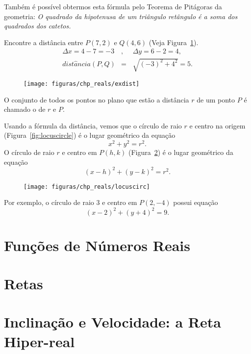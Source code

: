 \documentclass{svmono}
\begin{document}
Também é possível obtermos esta fórmula pelo Teorema de Pitágoras
da geometria: \emph{O quadrado da hipotenusa de um triângulo
retângulo é a soma dos quadrados dos catetos.}

\begin{example}
\label{ex:distance}
Encontre a distância entre $P(7,2)$ e $Q(4,6)$
(Veja Figura~\ref{fig:exdist}).
\begin{eqnarray*}
\Delta x = 4 - 7 = -3 &,\phantom{,} & \Delta y = 6 - 2 = 4, \\
 dist\hat{a}ncia(P,Q) & =           & \sqrt{(-3)^2 + 4^2} = 5.
\end{eqnarray*}
\end{example}

\begin{figure}
\texttt{[image: figuras/chp\_reals/exdist]}
\caption{}
\label{fig:exdist}
\end{figure}

\begin{defin}[círculo]
O conjunto de todos os pontos no plano que estão a distância $r$ de um ponto
$P$ é chamado o  de  $r$ e  $P$.
\end{defin}

Usando a fórmula da distância, vemos que o círculo de raio $r$ e centro na
origem (Figura~\ref{fig:locuscircle}) é o lugar geométrico da equação
\[
	x^2 + y^2 = r^2.
\]
O círculo de raio $r$ e centro em $P(h,k)$ (Figura~\ref{fig:locuscirc}) é
o lugar geométrico da equação
\[
	(x-h)^2 + (y-k)^2 = r^2.
\]

\begin{figure}
\texttt{[image: figuras/chp\_reals/locuscirc]}
\caption{}
\label{fig:locuscirc}
\end{figure}

Por exemplo, o círculo de raio $3$ e centro em $P(2,-4)$ possui equação
\[
	(x-2)^2 + (y+4)^2 = 9.
\]

\sectionproblems{\ref{sec:realline}}

\section{Funções de Números Reais}
\label{sec:funcreal}

\section{Retas}
\label{sec:lines}

\section{Inclinação e Velocidade: a Reta Hiper-real}
\label{sec:hyperrealline}
\end{document}
